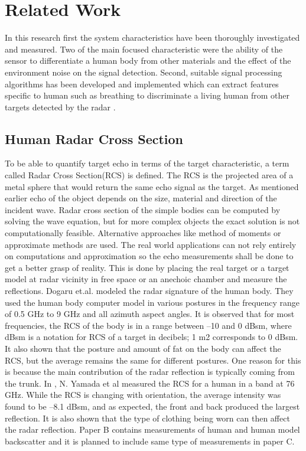
\section{Related Work} 
In this research first the system characteristics have been thoroughly investigated and measured. Two of the main focused characteristic were the ability of the sensor to differentiate a human body from other materials and the effect of the environment noise on the signal detection. Second, suitable signal processing algorithms has been developed and implemented which can extract features specific to human such as breathing to discriminate a living human from other targets detected by the radar . 
 
\subsection{Human Radar Cross Section }
To be able to quantify target echo in terms of  the target characteristic, a term called Radar Cross Section(RCS) is defined. The RCS is the projected area of a metal sphere that would return the same echo signal as the target. As mentioned earlier echo of the object depends on the size, material and direction of the incident wave. Radar cross section of the simple bodies can be computed by solving the wave equation, but for more complex objects the exact solution is not computationally feasible. Alternative approaches like method of moments or approximate methods are used. The real world applications can not rely entirely on computations and approximation so the echo measurements shall be done to get a better grasp of reality. This is done by placing the real target or a target model at radar vicinity in free space or an anechoic chamber and measure the reflections\cite{skolnik2008radar}. Dogaru et.al.\cite{Dogaru2007} modeled the radar signature of the human body. They used the human body computer model in various postures in the frequency range of 0.5 GHz to 9 GHz and all azimuth aspect angles. It is observed that for most frequencies, the RCS of the body is in a range between –10 and 0 dBsm, where dBsm is a notation for RCS of a target in decibels; 1 m2 corresponds to 0 dBsm. It also shown that the posture and amount of fat on the body can affect the RCS, but the average remains the same for different postures. One reason for this is because the main contribution of the radar reflection is typically coming from the trunk.
In \cite{Yamada2005}, N. Yamada et al measured the RCS for a human in a band at 76 GHz. While the RCS is changing with orientation, the average intensity was found to be –8.1 dBsm, and as expected, the front and back produced the largest reflection. It is also shown that the type of clothing being worn can then affect the radar reflection.
Paper B contains measurements of human and human model backscatter and it is planned to include same type of measurements in paper C.

